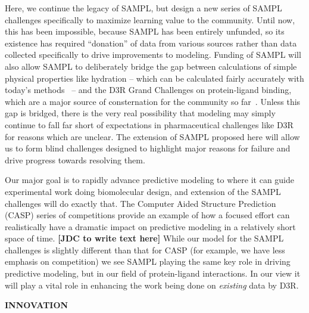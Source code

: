 \documentclass[11pt]{article}
\begin{document}
Here, we continue the legacy of SAMPL, but design a new series of SAMPL challenges specifically to maximize learning value to the community.
Until now, this has been impossible, because SAMPL has been entirely unfunded, so its existence has required ``donation'' of data from various sources rather than data collected specifically to drive improvements to modeling. 
Funding of SAMPL will also allow SAMPL to deliberately bridge the gap between calculations of simple physical properties like hydration -- which can be calculated fairly accurately with today's methods~\cite{mobley_blind_2014-1} -- 
and the D3R Grand Challenges on protein-ligand binding, which are a major source of consternation for the community so far~\cite{ignjatovic_binding-affinity_2016, deng_large_2016, sunseri_d3r_2016}.
Unless this gap is bridged, there is the very real possibility that modeling may simply continue to fall far short of expectations in pharmaceutical challenges like D3R for reasons which are unclear.
The extension of SAMPL proposed here will allow us to form blind challenges designed to highlight major reasons for failure and drive progress towards resolving them.

Our major goal is to rapidly advance predictive modeling to where it can guide experimental work doing biomolecular design, and extension of the SAMPL challenges will do exactly that.
The Computer Aided Structure Prediction (CASP) series of competitions provide an example of how a focused effort can realistically have a dramatic impact on predictive modeling in a relatively short space of time.  {\bf [JDC to write text here]}
While our model for the SAMPL challenges is slightly different than that for CASP (for example, we have less emphasis on competition) we see SAMPL playing the same key role in driving predictive modeling, but in our field of protein-ligand interactions. 
In our view it will play a vital role in enhancing the work being done on \emph{existing} data by D3R. 



{\large \bf INNOVATION}
\end{document}
